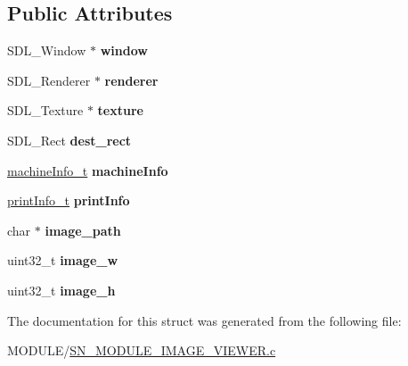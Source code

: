 \subsection*{Public Attributes}
\begin{DoxyCompactItemize}
\item 
\mbox{\label{structimage__viewer_a7aa8ff90430ce37f77e0473fef98acfb}} 
S\+D\+L\+\_\+\+Window $\ast$ {\bfseries window}
\item 
\mbox{\label{structimage__viewer_a15c11d0e9c16bb8cd2e66e533d29bf49}} 
S\+D\+L\+\_\+\+Renderer $\ast$ {\bfseries renderer}
\item 
\mbox{\label{structimage__viewer_abd3a6500c6dc389627ca4d88cb688d81}} 
S\+D\+L\+\_\+\+Texture $\ast$ {\bfseries texture}
\item 
\mbox{\label{structimage__viewer_ab8b67fbf6967a2b072e7ceec0ad002c0}} 
S\+D\+L\+\_\+\+Rect {\bfseries dest\+\_\+rect}
\item 
\mbox{\label{structimage__viewer_ae34bb6294b7789eaaa37a917592d0a2c}} 
\hyperlink{structmachine__information}{machine\+Info\+\_\+t} {\bfseries machine\+Info}
\item 
\mbox{\label{structimage__viewer_a3f7d3425748942aaceb6dc66408d6355}} 
\hyperlink{structprint__information}{print\+Info\+\_\+t} {\bfseries print\+Info}
\item 
\mbox{\label{structimage__viewer_a39e8828eae966bbc9cf65e2a681ca9e7}} 
char $\ast$ {\bfseries image\+\_\+path}
\item 
\mbox{\label{structimage__viewer_a55eb5d93ecd1e3a138d64b5d158980b0}} 
uint32\+\_\+t {\bfseries image\+\_\+w}
\item 
\mbox{\label{structimage__viewer_aca799b98d1db4a741969dd24ecac358a}} 
uint32\+\_\+t {\bfseries image\+\_\+h}
\end{DoxyCompactItemize}


The documentation for this struct was generated from the following file\+:\begin{DoxyCompactItemize}
\item 
M\+O\+D\+U\+L\+E/\hyperlink{SN__MODULE__IMAGE__VIEWER_8c}{S\+N\+\_\+\+M\+O\+D\+U\+L\+E\+\_\+\+I\+M\+A\+G\+E\+\_\+\+V\+I\+E\+W\+E\+R.\+c}\end{DoxyCompactItemize}
